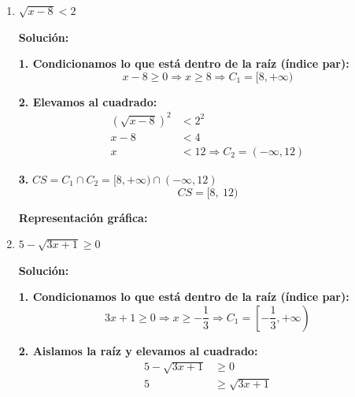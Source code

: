 \documentclass[12pt]{article}
\newcommand{\solucion}{%
    \vspace{0.8em}%
    \textbf{Solución:}%
}
\begin{document}
\begin{enumerate}[label=\alph*.-]
\begin{center}
    \end{center}

    \newpage
    \item $\sqrt{x-8} < 2$

    \solucion

    \textbf{1. Condicionamos lo que está dentro de la raíz (índice par):}
    \[
    x - 8 \geq 0 \Rightarrow x \geq 8 \Rightarrow C_1 = [8, +\infty)
    \]

    \textbf{2. Elevamos al cuadrado:}
    \begin{align*}
    \left(\sqrt{x-8}\right)^2 &< 2^2 \\[0.3em]
    x - 8 &< 4 \\[0.3em]
    x &< 12 \Rightarrow C_2 = (-\infty, 12)
    \end{align*}

    \textbf{3.} $CS = C_1 \cap C_2 = [8, +\infty) \cap (-\infty, 12)$
    \[
    \boxed{CS = [8,\ 12)}
    \]

    \textbf{Representación gráfica:}

    \begin{center}
    \end{center}

    \newpage
    \item $5 - \sqrt{3x+1} \geq 0$

    \solucion

    \textbf{1. Condicionamos lo que está dentro de la raíz (índice par):}
    \[
    3x + 1 \geq 0 \Rightarrow x \geq -\dfrac{1}{3} \Rightarrow C_1 = \left[-\dfrac{1}{3}, +\infty\right)
    \]

    \textbf{2. Aislamos la raíz y elevamos al cuadrado:}
    \begin{align*}
    5 - \sqrt{3x+1} &\geq 0 \\[0.3em]
    5 &\geq \sqrt{3x+1}
    \end{align*}


\end{enumerate}
\end{document}
